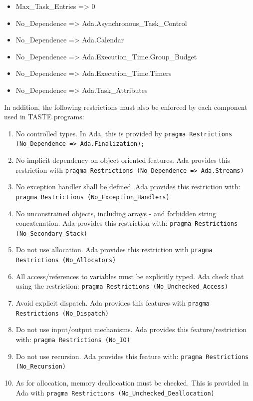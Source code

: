 \documentclass[11pt]{book}
\newcommand{\Concept}[1]{#1\xspace}
\newcommand{\taste}{\Concept{TASTE}}
\begin{document}
\begin{enumerate}
\begin{itemize}
            \item
                Max\_Task\_Entries       => 0
            \item
                No\_Dependence => Ada.Asynchronous\_Task\_Control
            \item
                No\_Dependence => Ada.Calendar
            \item
                No\_Dependence => Ada.Execution\_Time.Group\_Budget
            \item
                No\_Dependence => Ada.Execution\_Time.Timers
            \item
                No\_Dependence => Ada.Task\_Attributes
          \end{itemize}
   \end{enumerate}

   In addition, the following restrictions must also be enforced by each
   component used in \taste programs:
   \begin{enumerate}
      \item
         No controlled types. In Ada, this is provided by \texttt{pragma Restrictions (No\_Dependence => Ada.Finalization);}

      \item
         No implicit dependency on object oriented features.
         Ada provides this restriction with
         \texttt{pragma Restrictions (No\_Dependence => Ada.Streams)}

      \item
         No exception handler shall be defined.
         Ada provides this restriction with:
         \texttt{pragma Restrictions (No\_Exception\_Handlers)}

      \item
         No unconstrained objects, including arrays - and forbidden
         string concatenation.
         Ada provides this restriction with:
         \texttt{pragma Restrictions (No\_Secondary\_Stack)}

      \item
         Do not use allocation. Ada provides this restriction with
         \texttt{pragma Restrictions (No\_Allocators)}
      \item
         All access/references to variables must be explicitly typed.
         Ada check that using the restriction:
         \texttt{pragma Restrictions (No\_Unchecked\_Access)}
      \item
         Avoid explicit dispatch. Ada provides this features with
         \texttt{pragma Restrictions (No\_Dispatch)}
      \item
         Do not use input/output mechanisms.
         Ada provides this feature/restriction with:
         \texttt{pragma Restrictions (No\_IO)}
      \item
         Do not use recursion. Ada provides this feature with:
         \texttt{pragma Restrictions (No\_Recursion)}
      \item
         As for allocation, memory deallocation must be checked.
         This is provided in Ada with
         \texttt{pragma Restrictions (No\_Unchecked\_Deallocation)}
   \end{enumerate}
\end{document}
